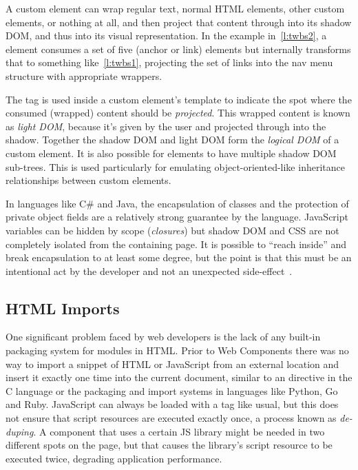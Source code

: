 A custom element can wrap regular text, normal HTML elements, other custom elements, or nothing at all,
and then project that content through into its shadow DOM, 
and thus into its visual representation.
In the example in~\cref{l:twbs2}, 
a \textbf{} element consumes a set of five 
\textbf{} (anchor or link) elements but internally transforms that to something like~\cref{l:twbs1}, 
projecting the set of links into the nav menu structure with appropriate wrappers.

The  tag is used inside a custom element's template to indicate the spot where the consumed (wrapped) content should be \textit{projected}. 
This wrapped content is known as 
\textit{light DOM}, 
because it's given by the user and projected through into the shadow.
Together the shadow DOM and light DOM form the \textit{logical DOM} of a custom element.
It is also possible for elements to have multiple shadow DOM sub-trees. 
This is used particularly for emulating object-oriented-like inheritance relationships between custom elements.

In languages like C\# and Java, the encapsulation of classes and the protection of private object fields are a relatively strong guarantee by the language.
JavaScript variables can be hidden by scope (\textit{closures})
but shadow DOM and CSS are not completely isolated from the containing page.
It is possible to ``reach inside'' and break encapsulation to at least some degree, 
but the point is that this must be an intentional act by the developer and not an unexpected side-effect~\cite{bidelman2014}.

\subsection{HTML Imports}
One significant problem faced by web developers is the lack of any built-in packaging system for modules in HTML.
Prior to Web Components there was no way to import a snippet of HTML or JavaScript from an external location and insert it exactly one time into the current document, 
similar to an  directive in the C language or the packaging and import systems in languages
like Python, Go and Ruby. 
JavaScript can always be loaded with a  tag like usual, but this does not ensure that script resources are executed exactly once, a process known as \textit{de-duping}.
A component that uses a certain JS library might be needed in two different spots on the page, 
but that causes the library's script resource to be executed twice, degrading application performance.

